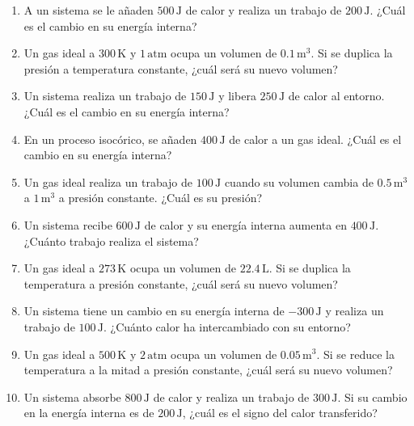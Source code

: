 \documentclass[../main]{subfiles}
\begin{document}
\begin{enumerate}
    \item A un sistema se le añaden $500 \, \text{J}$ de calor y realiza un trabajo de $200 \, \text{J}$. ¿Cuál es el cambio en su energía interna?
    \item Un gas ideal a $300 \, \text{K}$ y $1 \, \text{atm}$ ocupa un volumen de $0.1 \, \text{m}^3$. Si se duplica la presión a temperatura constante, ¿cuál será su nuevo volumen?
    \item Un sistema realiza un trabajo de $150 \, \text{J}$ y libera $250 \, \text{J}$ de calor al entorno. ¿Cuál es el cambio en su energía interna?
    \item En un proceso isocórico, se añaden $400 \, \text{J}$ de calor a un gas ideal. ¿Cuál es el cambio en su energía interna?
    \item Un gas ideal realiza un trabajo de $100 \, \text{J}$ cuando su volumen cambia de $0.5 \, \text{m}^3$ a $1 \, \text{m}^3$ a presión constante. ¿Cuál es su presión?
    \item Un sistema recibe $600 \, \text{J}$ de calor y su energía interna aumenta en $400 \, \text{J}$. ¿Cuánto trabajo realiza el sistema?
    \item Un gas ideal a $273 \, \text{K}$ ocupa un volumen de $22.4 \, \text{L}$. Si se duplica la temperatura a presión constante, ¿cuál será su nuevo volumen?
    \item Un sistema tiene un cambio en su energía interna de $-300 \, \text{J}$ y realiza un trabajo de $100 \, \text{J}$. ¿Cuánto calor ha intercambiado con su entorno?
    \item Un gas ideal a $500 \, \text{K}$ y $2 \, \text{atm}$ ocupa un volumen de $0.05 \, \text{m}^3$. Si se reduce la temperatura a la mitad a presión constante, ¿cuál será su nuevo volumen?
    \item Un sistema absorbe $800 \, \text{J}$ de calor y realiza un trabajo de $300 \, \text{J}$. Si su cambio en la energía interna es de $200 \, \text{J}$, ¿cuál es el signo del calor transferido?
\end{enumerate}
\end{document}
